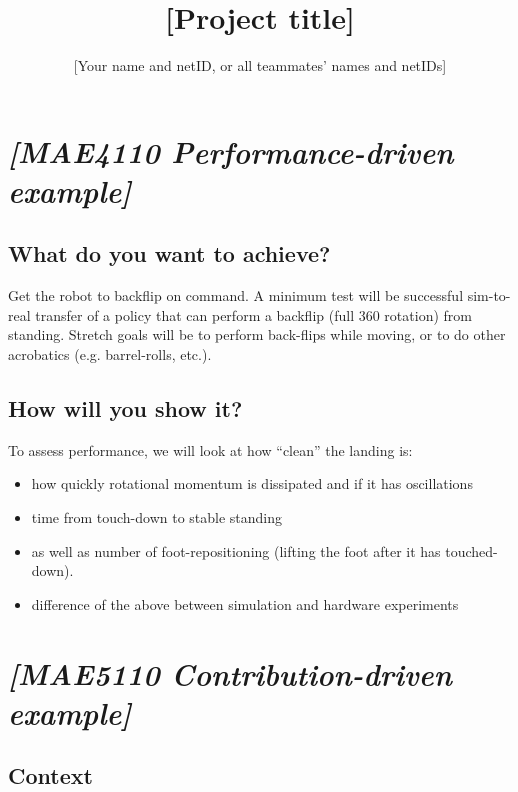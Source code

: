 \documentclass[
  11pt,
  letterpaper,
]{article}
\title{{[}Project title{]}}
\author{{[}Your name and netID, or all teammates' names and netIDs{]}}
\date{}
\makeatletter
\providecommand{\tightlist}{%
  \setlength{\itemsep}{0pt}\setlength{\parskip}{0pt}}
\renewcommand{\maketitle}{%
  \begingroup\centering
  {\Large\bfseries\@title\par}
  \vspace{0.35em}
  {\normalsize\@author\par}
  \endgroup\vspace{0.6em}}
\newif\ifoutlinefirstsection
\let\outlinesection\section
\renewcommand{\section}{%
  \ifoutlinefirstsection\outlinefirstsectionfalse\else\clearpage\fi
  \outlinesection}
\makeatother
\begin{document}
\maketitle

\section{\texorpdfstring{\emph{{[}MAE4110 Performance-driven
example{]}}}{{[}MAE4110 Performance-driven example{]}}}\label{mae4110-performance-driven-example}

\subsection{What do you want to
achieve?}\label{what-do-you-want-to-achieve}

Get the robot to backflip on command. A minimum test will be successful
sim-to-real transfer of a policy that can perform a backflip (full 360
rotation) from standing. Stretch goals will be to perform back-flips
while moving, or to do other acrobatics (e.g. barrel-rolls, etc.).

\subsection{How will you show it?}\label{how-will-you-show-it}

To assess performance, we will look at how ``clean'' the landing is:

\begin{itemize}
\tightlist
\item
  how quickly rotational momentum is dissipated and if it has
  oscillations
\item
  time from touch-down to stable standing
\item
  as well as number of foot-repositioning (lifting the foot after it has
  touched-down).
\item
  difference of the above between simulation and hardware experiments
\end{itemize}

\section{\texorpdfstring{\emph{{[}MAE5110 Contribution-driven
example{]}}}{{[}MAE5110 Contribution-driven example{]}}}\label{mae5110-contribution-driven-example}

\subsection{Context}\label{context}
\end{document}

